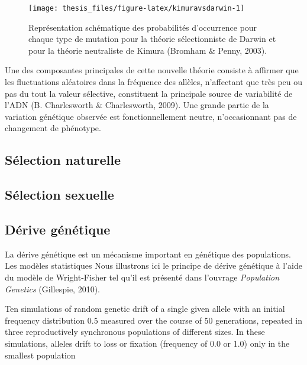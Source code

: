 \documentclass[12pt,twoside]{ugathesis}
\begin{document}
\begin{figure}

{\centering \texttt{[image: thesis\_files/figure-latex/kimuravsdarwin-1]} 

}

\caption{Représentation schématique des probabilités
d'occurrence pour chaque type de mutation pour la théorie sélectionniste
de Darwin et pour la théorie neutraliste de Kimura (Bromham \& Penny,
2003).}\label{fig:kimuravsdarwin}
\end{figure}
Une des composantes principales de cette nouvelle théorie consiste à
affirmer que les fluctuations aléatoires dans la fréquence des allèles,
n'affectant que très peu ou pas du tout la valeur sélective, constituent
la principale source de variabilité de l'ADN (B. Charlesworth \&
Charlesworth, 2009). Une grande partie de la variation génétique
observée est fonctionnellement neutre, n'occasionnant pas de changement
de phénotype.

\subsection{Sélection naturelle}\label{selection-naturelle}

\subsection{Sélection sexuelle}\label{selection-sexuelle}

\subsection{Dérive génétique}\label{derive-genetique}

La dérive génétique est un mécanisme important en génétique des
populations. Les modèles statistiques Nous illustrons ici le principe de
dérive génétique à l'aide du modèle de Wright-Fisher tel qu'il est
présenté dans l'ouvrage \emph{Population Genetics} (Gillespie, 2010).

Ten simulations of random genetic drift of a single given allele with an
initial frequency distribution 0.5 measured over the course of 50
generations, repeated in three reproductively synchronous populations of
different sizes. In these simulations, alleles drift to loss or fixation
(frequency of 0.0 or 1.0) only in the smallest population
\end{document}
